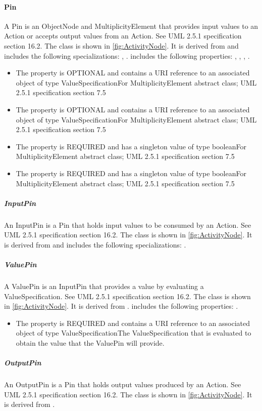 \paragraph{Pin}%
\label{sec:uml:Pin}%
A Pin is an ObjectNode and MultiplicityElement that provides input values to an Action or accepts output values from an Action. See UML 2.5.1 specification section 16.2.%
\linebreak%
\linebreak%
The  class is shown in \ref{fig:ActivityNode}. It is derived from  and includes the following specializations: , . %
 includes the following properties: , , , . %
\begin{itemize}%
\item%
The  property is OPTIONAL and contains a URI reference to an associated object of type ValueSpecificationFor MultiplicityElement abstract class; UML 2.5.1 specification section 7.5%
\item%
The  property is OPTIONAL and contains a URI reference to an associated object of type ValueSpecificationFor MultiplicityElement abstract class; UML 2.5.1 specification section 7.5%
\item%
The  property is REQUIRED and has a singleton value of type booleanFor MultiplicityElement abstract class; UML 2.5.1 specification section 7.5%
\item%
The  property is REQUIRED and has a singleton value of type booleanFor MultiplicityElement abstract class; UML 2.5.1 specification section 7.5%
\end{itemize}%
\subparagraph{InputPin}%
\label{sec:uml:InputPin}%
An InputPin is a Pin that holds input values to be consumed by an Action. See UML 2.5.1 specification section 16.2.%
\linebreak%
\linebreak%
The  class is shown in \ref{fig:ActivityNode}. It is derived from  and includes the following specializations: . %
%
\subparagraph{ValuePin}%
\label{sec:uml:ValuePin}%
A ValuePin is an InputPin that provides a value by evaluating a ValueSpecification. See UML 2.5.1 specification section 16.2.%
\linebreak%
\linebreak%
The  class is shown in \ref{fig:ActivityNode}. It is derived from .%
 includes the following properties: . %
\begin{itemize}%
\item%
The  property is REQUIRED and contains a URI reference to an associated object of type ValueSpecificationThe ValueSpecification that is evaluated to obtain the value that the ValuePin will provide.%
\end{itemize}%
\subparagraph{OutputPin}%
\label{sec:uml:OutputPin}%
An OutputPin is a Pin that holds output values produced by an Action. See UML 2.5.1 specification section 16.2.%
\linebreak%
\linebreak%
The  class is shown in \ref{fig:ActivityNode}. It is derived from .%
%
